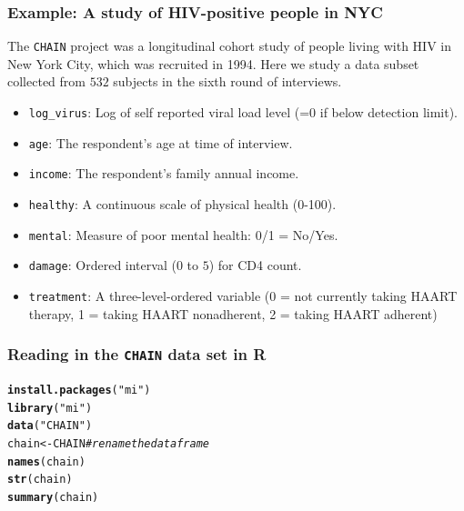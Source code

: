 \documentclass{beamer}\usepackage[]{graphicx}\usepackage[]{color}
\makeatletter
\newcommand{\hlstr}[1]{\textcolor[rgb]{0.192,0.494,0.8}{#1}}%
\newcommand{\hlcom}[1]{\textcolor[rgb]{0.678,0.584,0.686}{\textit{#1}}}%
\newcommand{\hlstd}[1]{\textcolor[rgb]{0.345,0.345,0.345}{#1}}%
\newcommand{\hlkwb}[1]{\textcolor[rgb]{0.69,0.353,0.396}{#1}}%
\newcommand{\hlkwd}[1]{\textcolor[rgb]{0.737,0.353,0.396}{\textbf{#1}}}%
\newenvironment{kframe}{%
 \def\at@end@of@kframe{}%
 \ifinner\ifhmode%
  \def\at@end@of@kframe{\end{minipage}}%
  \begin{minipage}{\columnwidth}%
 \fi\fi%
 \def\FrameCommand##1{\hskip\@totalleftmargin \hskip-\fboxsep
 \colorbox{shadecolor}{##1}\hskip-\fboxsep
     \hskip-\linewidth \hskip-\@totalleftmargin \hskip\columnwidth}%
 \MakeFramed {\advance\hsize-\width
   \@totalleftmargin\z@ \linewidth\hsize
   \@setminipage}}%
 {\par\unskip\endMakeFramed%
 \at@end@of@kframe}
\newenvironment{knitrout}{}{} %
\makeatother
\begin{document}
{{{
\begin{frame}
\frametitle{Example: A study of HIV-positive people in NYC}
The \texttt{CHAIN} project was a longitudinal cohort study of people living with
HIV in New York City, which was recruited in 1994. Here we study a data subset
collected from $532$ subjects in the sixth round of interviews.
\begin{itemize}
\item \texttt{log\_virus}: Log of self reported viral load level (=0 if below detection limit).
\item \texttt{age}: The respondent's age at time of interview.
\item \texttt{income}: The respondent's family annual income.
\item \texttt{healthy}: A continuous scale of physical health (0-100).
\item \texttt{mental}: Measure of poor mental health: 0/1 = No/Yes.
\item \texttt{damage}: Ordered interval ($0$ to $5$) for CD4 count.
\item \texttt{treatment}: A three-level-ordered variable (0 = not currently
taking HAART therapy, 1 = taking HAART nonadherent, 2 = taking HAART adherent)
\end{itemize}
\end{frame}

\begin{frame}[fragile]
\frametitle{Reading in the \texttt{CHAIN} data set in R}


\begin{knitrout}
\color{fgcolor}\begin{kframe}
\begin{alltt}
\hlkwd{install.packages}\hlstd{(}\hlstr{"mi"}\hlstd{)}
\hlkwd{library}\hlstd{(}\hlstr{"mi"}\hlstd{)}
\hlkwd{data}\hlstd{(}\hlstr{"CHAIN"}\hlstd{)}
\hlstd{chain} \hlkwb{<-} \hlstd{CHAIN} \hlcom{# rename the data frame}
\hlkwd{names}\hlstd{(chain)}
\hlkwd{str}\hlstd{(chain)}
\hlkwd{summary}\hlstd{(chain)}
\end{alltt}
\end{kframe}
\end{knitrout}
\end{frame}

}}}
\end{document}
